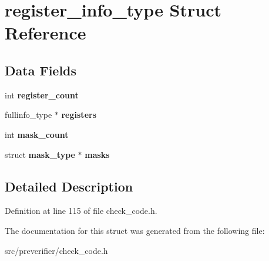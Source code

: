 \section{register\_\-info\_\-type Struct Reference}
\label{structregister__info__type}
\subsection*{Data Fields}
\begin{DoxyCompactItemize}
\item 
int {\bfseries register\_\-count}\label{structregister__info__type_ad0281d94b3f87a1240e5be55f3158dbf}

\item 
fullinfo\_\-type $\ast$ {\bfseries registers}\label{structregister__info__type_a757acce5be3f0568c65be0989934dbb0}

\item 
int {\bfseries mask\_\-count}\label{structregister__info__type_a416eec921fdfb6d1f81b56a053510b05}

\item 
struct {\bf mask\_\-type} $\ast$ {\bfseries masks}\label{structregister__info__type_a1bae057268988a0837665cad020e889d}

\end{DoxyCompactItemize}


\subsection{Detailed Description}


Definition at line 115 of file check\_\-code.h.



The documentation for this struct was generated from the following file:\begin{DoxyCompactItemize}
\item 
src/preverifier/check\_\-code.h\end{DoxyCompactItemize}
